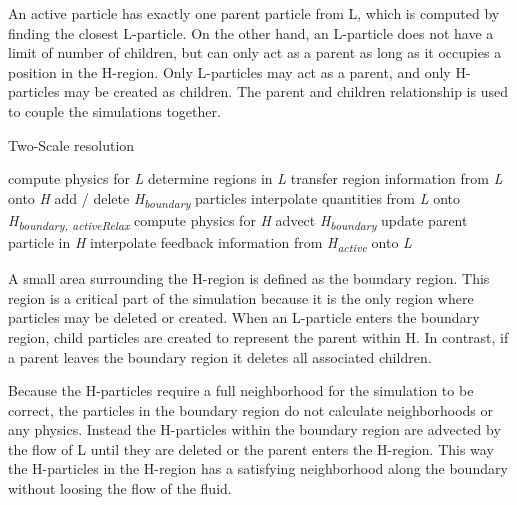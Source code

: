 \documentclass[../../main.tex]{subfiles}
\begin{document}
An active particle has exactly one parent particle from L, which is computed by finding the closest L-particle. On the other hand, an L-particle does not have a limit of number of children, but can only act as a parent as long as it occupies a position in the H-region. Only L-particles may act as a parent, and only H-particles may be created as children. The parent and children relationship is used to couple the simulations together. %


\begin{algorithm}[h]
    \caption{Two-Scale resolution}
    \label{alg:twoscale}
    \begin{algorithmic}[1]
        \State compute physics for \textit{L}
        \State determine regions in \textit{L}
        \State transfer region information from \textit{L} onto \textit{H}
        \State add / delete \textit{\texorpdfstring{H\textsubscript{boundary}}{H boundary}} particles
        \State interpolate quantities from \textit{L} onto \textit{\texorpdfstring{H\textsubscript{boundary, activeRelax}}{H boundary, activeRelax}}
                \State compute physics for \textit{H}
            \State advect \textit{\texorpdfstring{H\textsubscript{boundary}}{H boundary}}
        \EndFor
        \State update parent particle in \textit{H}
        \State interpolate feedback information from \textit{{\texorpdfstring{H\textsubscript{active}}{H active}}} onto \textit{L}
        \EndWhile
   \end{algorithmic}
\end{algorithm}

A small area surrounding the H-region is defined as the boundary region. This region is a critical part of the simulation because it is the only region where particles may be deleted or created. When an L-particle enters the boundary region, child particles are created to represent the parent within H. In contrast, if a parent leaves the boundary region it deletes all associated children. 

Because the H-particles require a full neighborhood for the simulation to be correct, the particles in the boundary region do not calculate neighborhoods or any physics. Instead the H-particles within the boundary region are advected by the flow of L until they are deleted or the parent enters the H-region. This way the H-particles in the H-region has a satisfying neighborhood along the boundary without loosing the flow of the fluid. 
\end{document}
